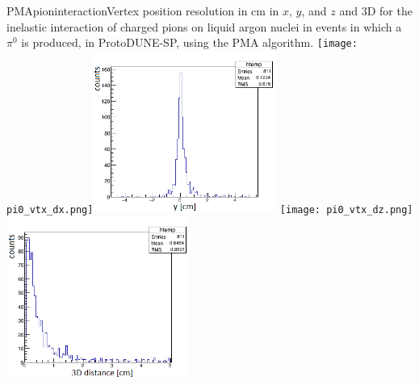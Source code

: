 \begin{cdrfigure}{PMApioninteraction}{Vertex position resolution in cm in $x$, $y$, and $z$ and 3D for the
  inelastic interaction of charged pions on liquid argon nuclei in events in which a $\pi^0$ is produced, in
  ProtoDUNE-SP, using the PMA algorithm.}
\texttt{[image: pi0\_vtx\_dx.png]}\includegraphics[width=0.45\textwidth]{figures/pi0_vtx_dy.png}
\texttt{[image: pi0\_vtx\_dz.png]}\includegraphics[width=0.45\textwidth]{figures/pi0_vtx3d.png}
\end{cdrfigure}

